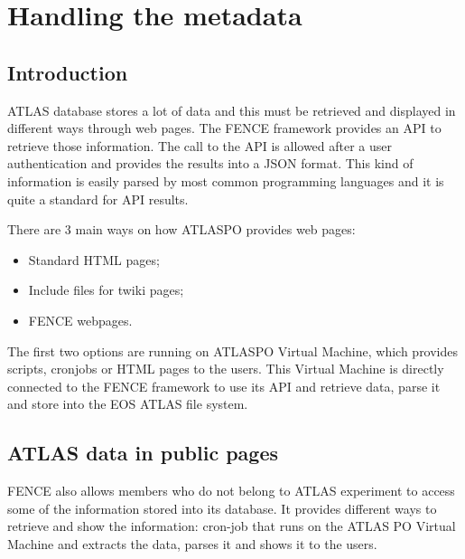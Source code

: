 \section{Handling the metadata}
\label{sec:Handling_the_metadata}

\subsection{Introduction}
ATLAS database stores a lot of data and this must be retrieved and displayed in different ways through web pages. The FENCE framework provides an API to retrieve those information. The call to the API is allowed after a user authentication and provides the results into a JSON format. This kind of information is easily parsed by most common programming languages and it is quite a standard for API results.
 
There are 3 main ways on how ATLASPO provides web pages:

\begin{itemize}
\item Standard HTML pages;
\item Include files for twiki pages;
\item FENCE webpages.
\end{itemize}

The first two options are running on ATLASPO Virtual Machine, which provides scripts, cronjobs or HTML pages to the users. This Virtual Machine is directly connected to the FENCE framework to use its API and retrieve data, parse it and store into the EOS ATLAS file system.


\subsection{ATLAS data in public pages}
\label{sec:ATLAS_data_in_public_pages}

FENCE also allows members who do not belong to ATLAS experiment to access some of the information stored into its database. It provides different ways to retrieve and show the information: cron-job that runs on the ATLAS PO Virtual Machine and extracts the data, parses it and shows it to the users.
 
